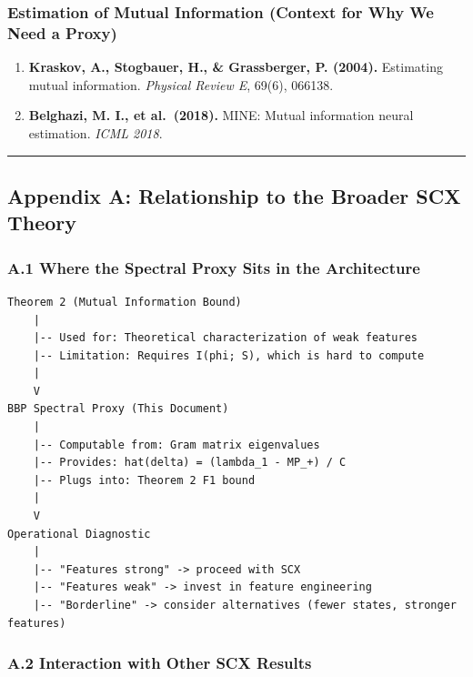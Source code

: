 \documentclass[
  12pt,
]{article}
\begin{document}
\subsubsection{Estimation of Mutual Information (Context for Why We Need
a
Proxy)}\label{estimation-of-mutual-information-context-for-why-we-need-a-proxy}

\begin{enumerate}
\def\labelenumi{\arabic{enumi}.}
\setcounter{enumi}{17}
\item
  \textbf{Kraskov, A., Stogbauer, H., \& Grassberger, P. (2004).}
  Estimating mutual information. \emph{Physical Review E}, 69(6),
  066138.
\item
  \textbf{Belghazi, M. I., et al.~(2018).} MINE: Mutual information
  neural estimation. \emph{ICML 2018}.
\end{enumerate}

\begin{center}\rule{0.5\linewidth}{0.5pt}\end{center}

\subsection{Appendix A: Relationship to the Broader SCX
Theory}\label{appendix-a-relationship-to-the-broader-scx-theory}

\subsubsection{A.1 Where the Spectral Proxy Sits in the
Architecture}\label{a.1-where-the-spectral-proxy-sits-in-the-architecture}

\begin{verbatim}
Theorem 2 (Mutual Information Bound)
    |
    |-- Used for: Theoretical characterization of weak features
    |-- Limitation: Requires I(phi; S), which is hard to compute
    |
    V
BBP Spectral Proxy (This Document)
    |
    |-- Computable from: Gram matrix eigenvalues
    |-- Provides: hat(delta) = (lambda_1 - MP_+) / C
    |-- Plugs into: Theorem 2 F1 bound
    |
    V
Operational Diagnostic
    |
    |-- "Features strong" -> proceed with SCX
    |-- "Features weak" -> invest in feature engineering
    |-- "Borderline" -> consider alternatives (fewer states, stronger features)
\end{verbatim}

\subsubsection{A.2 Interaction with Other SCX
Results}\label{a.2-interaction-with-other-scx-results}
\end{document}
